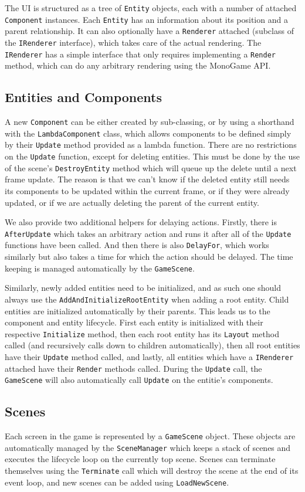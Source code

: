 The UI is structured as a tree of \verb|Entity| objects, each with a number of attached \verb|Component| instances. Each \verb|Entity| has an information about its position and a parent relationship. It can also optionally have a \verb|Renderer| attached (subclass of the \verb|IRenderer| interface), which takes care of the actual rendering. The \verb|IRenderer| has a simple interface that only requires implementing a \verb|Render| method, which can do any arbitrary rendering using the MonoGame \citep{monogame} API.

\subsection{Entities and Components}

A new \verb|Component| can be either created by sub-classing, or by using a shorthand with the \verb|LambdaComponent| class, which allows components to be defined simply by their \verb|Update| method provided as a lambda function. There are no restrictions on the \verb|Update| function, except for deleting entities. This must be done by the use of the scene's \verb|DestroyEntity| method which will queue up the delete until a next frame update. The reason is that we can't know if the deleted entity still needs its components to be updated within the current frame, or if they were already updated, or if we are actually deleting the parent of the current entity.

We also provide two additional helpers for delaying actions. Firstly, there is \verb|AfterUpdate| which takes an arbitrary action and runs it after all of the \verb|Update| functions have been called. And then there is also \verb|DelayFor|, which works similarly but also takes a time for which the action should be delayed. The time keeping is managed automatically by the \verb|GameScene|.

Similarly, newly added entities need to be initialized, and as such one should always use the \verb|AddAndInitializeRootEntity| when adding a root entity. Child entities are initialized automatically by their parents. This leads us to the component and entity lifecycle. First each entity is initialized with their respective \verb|Initialize| method, then each root entity has its \verb|Layout| method called (and recursively calls down to children automatically), then all root entities have their \verb|Update| method called, and lastly, all entities which have a \verb|IRenderer| attached have their \verb|Render| methods called. During the \verb|Update| call, the \verb|GameScene| will also automatically call \verb|Update| on the entitie's components.

\subsection{Scenes}

Each screen in the game is represented by a \verb|GameScene| object. These objects are automatically managed by the \verb|SceneManager| which keeps a stack of scenes and executes the lifecycle loop on the currently top scene. Scenes can terminate themselves using the \verb|Terminate| call which will destroy the scene at the end of its event loop, and new scenes can be added using \verb|LoadNewScene|.
